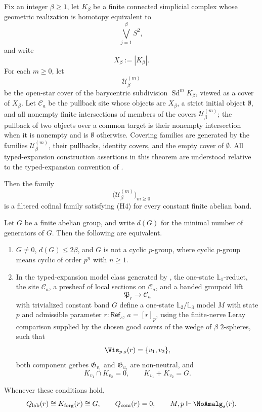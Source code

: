 \begin{theorem}\label{thm:bouquet-two-branch-resolution}
Fix an integer $\beta\ge 1$, let $K_\beta$ be a finite connected simplicial complex whose geometric realization is homotopy equivalent to
\[
\bigvee_{j=1}^{\beta} S^2,
\]
and write
\[
X_\beta:=|K_\beta|.
\]
For each $m\ge 0$, let
\[
\mathcal U_\beta^{(m)}
\]
be the open-star cover of the barycentric subdivision $\operatorname{Sd}^m K_\beta$, viewed as a cover of $X_\beta$. Let $\mathcal C_a$ be the pullback site whose objects are $X_\beta$, a strict initial object $\emptyset$, and all nonempty finite intersections of members of the covers $\mathcal U_\beta^{(m)}$; the pullback of two objects over a common target is their nonempty intersection when it is nonempty and is $\emptyset$ otherwise. Covering families are generated by the families $\mathcal U_\beta^{(m)}$, their pullbacks, identity covers, and the empty cover of $\emptyset$.
All typed-expansion construction assertions in this theorem are understood relative to the
typed-expansion convention of
.

Then the family
\[
\bigl(\mathcal U_\beta^{(m)}\bigr)_{m\ge 0}
\]
is a filtered cofinal family satisfying \textup{(H4)} for every constant finite abelian band.

Let $G$ be a finite abelian group, and write $d(G)$ for the minimal number of generators of $G$. Then the following are equivalent.
\begin{enumerate}[label=(\roman*),nosep]
\item $G\ne0$, $d(G)\le 2\beta$, and $G$ is not a cyclic $p$-group, where
cyclic $p$-group means cyclic of order $p^n$ with $n\ge1$.
\item In the typed-expansion model class generated by
, the one-state
\(\mathbb L_1\)-reduct, the site \(\mathcal C_a\), a presheaf of local sections on
\(\mathcal C_a\), and a banded groupoid lift
\[
\mathfrak P_r\to \mathcal C_a
\]
with trivialized constant band $G$ define a one-state
\(\mathbb L_2/\mathbb L_3\) model \(M\) with state \(p\) and admissible
parameter \(r:\mathsf{Ref}_s\), \(a=[r]_p\), using the finite-nerve Leray
comparison supplied by the chosen good covers of the wedge of $\beta$ $2$-spheres, such that
\[
\Vis_{p,s}(r)=\{v_1,v_2\},
\]
both component gerbes $\mathfrak G_{v_1}$ and $\mathfrak G_{v_2}$ are non-neutral, and
\[
K_{v_1}\cap K_{v_2}=0,
\qquad
K_{v_1}+K_{v_2}=G.
\]
\end{enumerate}
Whenever these conditions hold,
\[
Q_{\mathrm{lab}}(r)\cong K_{\mathrm{forg}}(r)\cong G,
\qquad
Q_{\mathrm{com}}(r)=0,
\qquad
M,p\Vdash \NoAmalg_s(r).
\]
\end{theorem}

